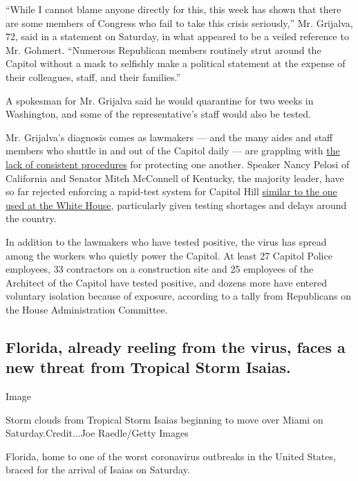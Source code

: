 ``While I cannot blame anyone directly for this, this week has shown
that there are some members of Congress who fail to take this crisis
seriously,'' Mr. Grijalva, 72, said in a statement on Saturday, in what
appeared to be a veiled reference to Mr. Gohmert. ``Numerous Republican
members routinely strut around the Capitol without a mask to selfishly
make a political statement at the expense of their colleagues, staff,
and their families.''

A spokesman for Mr. Grijalva said he would quarantine for two weeks in
Washington, and some of the representative's staff would also be tested.

Mr. Grijalva's diagnosis comes as lawmakers --- and the many aides and
staff members who shuttle in and out of the Capitol daily --- are
grappling with
\href{https://www.nytimes.com/2020/07/30/us/politics/gohmert-coronavirus-congress.html}{the
lack of consistent procedures} for protecting one another. Speaker Nancy
Pelosi of California and Senator Mitch McConnell of Kentucky, the
majority leader, have so far rejected enforcing a rapid-test system for
Capitol Hill
\href{https://www.nytimes.com/2020/05/01/us/politics/coronavirus-testing-senate-white-house.html}{similar
to the one used at the White House}, particularly given testing
shortages and delays around the country.

In addition to the lawmakers who have tested positive, the virus has
spread among the workers who quietly power the Capitol. At least 27
Capitol Police employees, 33 contractors on a construction site and 25
employees of the Architect of the Capitol have tested positive, and
dozens more have entered voluntary isolation because of exposure,
according to a tally from Republicans on the House Administration
Committee.

\hypertarget{florida-already-reeling-from-the-virus-faces-a-new-threat-from-tropical-storm-isaias}{%
\subsection{Florida, already reeling from the virus, faces a new threat
from Tropical Storm
Isaias.}\label{florida-already-reeling-from-the-virus-faces-a-new-threat-from-tropical-storm-isaias}}

Image

Storm clouds from Tropical Storm Isaias beginning to move over Miami on
Saturday.Credit...Joe Raedle/Getty Images

Florida, home to one of the worst coronavirus outbreaks in the United
States, braced for the arrival of Isaias on Saturday.

